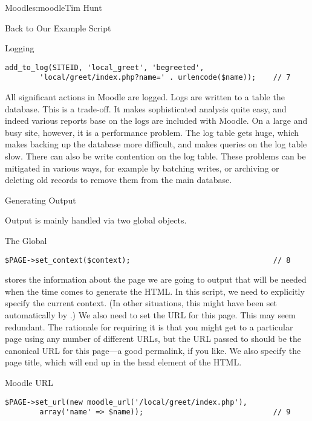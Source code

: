 \begin{aosachapter}{Moodle}{s:moodle}{Tim Hunt}
\begin{aosasect1}{Back to Our Example Script}
\begin{aosasect2}{Logging}
\begin{verbatim}
add_to_log(SITEID, 'local_greet', 'begreeted',
        'local/greet/index.php?name=' . urlencode($name));    // 7
\end{verbatim}

All significant actions in Moodle are logged. Logs are written to a
table the database. This is a trade-off. It makes sophisticated
analysis quite easy, and indeed various reports base on the logs are
included with Moodle. On a large and busy site, however, it is a
performance problem. The log table gets huge, which makes backing up
the database more difficult, and makes queries on the log table
slow. There can also be write contention on the log table. These
problems can be mitigated in various ways, for example by batching
writes, or archiving or deleting old records to remove them from the
main database.

\end{aosasect2}

\end{aosasect1}

\begin{aosasect1}{Generating Output}

Output is mainly handled via two global objects.

\begin{aosasect2}{The  Global}

\begin{verbatim}
$PAGE->set_context($context);                                 // 8
\end{verbatim}

 stores the information about the page we are going to
output that will be needed when the time comes to generate the
HTML. In this script, we need to explicitly specify the current
context. (In other situations, this might have been set automatically
by .) We also need to set the URL for this
page. This may seem redundant. The rationale for requiring it is that
you might get to a particular page using any number of different URLs,
but the URL passed to  should be the canonical URL for
this page---a good permalink, if you like. We also specify the page
title, which will end up in the head element of the HTML.

\end{aosasect2}

\begin{aosasect2}{Moodle URL}

\begin{verbatim}
$PAGE->set_url(new moodle_url('/local/greet/index.php'),
        array('name' => $name));                              // 9
\end{verbatim}


\end{aosasect2}
\end{aosasect1}
\end{aosachapter}
